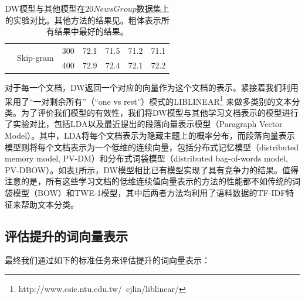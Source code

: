 \documentclass[master]{njuthesis}
\begin{document}
\begin{table}[htbp]
\begin{tabular}{|c|c|c|c|c|c|c|}
                                      & \multirow{2}{*}{Skip-gram}        & 300                                                    & 72.1                                                       & 71.5                                                       & 71.2                                                       & 71.1                                                       \\ \cline{3-7} 
                                      &                                   & 400                                                    &72.9                                                        & 72.4                                                        &72.1                                                        & 72.2                                                         \\ \hline
\end{tabular}
\caption{DW模型与其他模型在$20NewsGroup$数据集上的实验对比。其他方法的结果见\cite{liu2015topical}。粗体表示所有结果中最好的结果。}
\label{tab:tc_chap4}
\end{table}

对于每一个文档，DW返回一个对应的向量作为这个文档的表示。紧接着我们利用采用了``一对剩余所有''（``one vs rest''）模式的LIBLINEAR\footnote{http://www.csie.ntu.edu.tw/~cjlin/liblinear/} 来做多类别的文本分类。为了评价我们模型的有效性，我们将DW模型与其他学习文档表示的模型进行了实验对比，包括LDA以及最近提出的段落向量表示模型（Paragraph Vector Model）\cite{le2014distributed}。其中，LDA将每个文档表示为隐藏主题上的概率分布，而段落向量表示模型则将每个文档表示为一个低维的连续向量，包括分布式记忆模型（distributed memory model, PV-DM）和分布式词袋模型（distributed bag-of-words model, PV-DBOW）。如表\ref{tab:tc_chap4}所示，DW模型相比已有模型实现了具有竞争力的结果。值得注意的是，所有这些学习文档的低维连续值向量表示的方法的性能都不如传统的词袋模型（BOW）和TWE-1模型\cite{liu2015topical}，其中后两者方法均利用了语料数据的TF-IDF特征来帮助文本分类。


\subsection{评估提升的词向量表示}\label{subsec_evaluate_improved_word_chap4}

最终我们通过如下的标准任务来评估提升的词向量表示：
\end{document}
